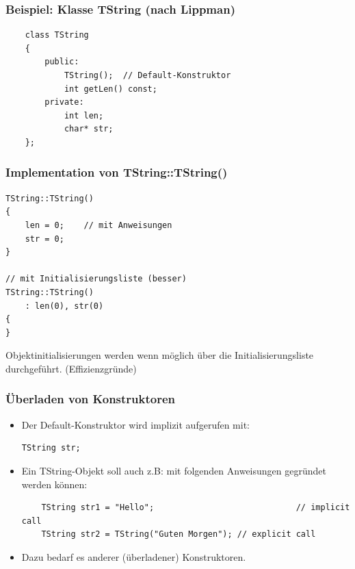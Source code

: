 \begin{multicols}{2}
\subsubsection{Beispiel: Klasse TString (nach Lippman)}
\vspace{-\baselineskip}
\begin{minipage}{\linewidth}
	\begin{lstlisting}
	class TString
	{
		public:		
			TString();	// Default-Konstruktor
			int getLen() const;
		private:
			int len;
			char* str;
	};
	\end{lstlisting}	
\end{minipage}
\vfill\null
\columnbreak%
\subsubsection{Implementation von TString::TString()}
\vspace{-\baselineskip}
\begin{minipage}{\linewidth}
\begin{lstlisting}
TString::TString()
{
	len = 0;	// mit Anweisungen
	str = 0;
}

// mit Initialisierungsliste (besser)
TString::TString()
	: len(0), str(0)
{
}
\end{lstlisting}
\end{minipage}
\begin{hinweis}
	Objektinitialisierungen werden wenn möglich über die Initialisierungsliste durchgeführt. (Effizienzgründe)
\end{hinweis}
\end{multicols}

\subsubsection{Überladen von Konstruktoren}
\begin{itemize}
	\item Der Default-Konstruktor wird implizit aufgerufen mit:\\
	\vspace{-\baselineskip}
	\begin{minipage}{\linewidth}
\begin{lstlisting}
TString str;
\end{lstlisting}
	\end{minipage}
	\item Ein TString-Objekt soll auch z.B: mit folgenden Anweisungen gegründet werden können:\\
	\vspace{-\baselineskip}
	\begin{minipage}{\linewidth}
\begin{lstlisting}
	TString str1 = "Hello";								// implicit call
	TString str2 = TString("Guten Morgen");	// explicit call
\end{lstlisting}
	\end{minipage}
	\item Dazu bedarf es anderer (überladener) Konstruktoren.
\end{itemize}

